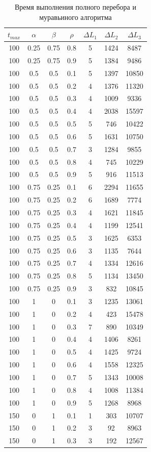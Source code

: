 \documentclass[12pt]{report}
\begin{document}
	\begin{table}[H]
		\begin{center}
			\caption[]{\label{tbl:only3} Время выполнения полного перебора и муравьиного алгоритма}
			\begin{tabular}{|c|c|c|c|c|c|c|}
				\hline
				$t_{max}$ & $\alpha$ & $\beta$& $\rho$ & $\Delta L_{1}$ & $\Delta L_{2}$ & $\Delta L_{3}$\\
				\hline
				100 & 0.25 & 0.75 & 0.8 & 5 & 1424 & 8487 \\
				100 & 0.25 & 0.75 & 0.9 & 5 & 1384 & 9486 \\
				100 & 0.5 & 0.5 & 0.1 & 5 & 1397 & 10850 \\
				100 & 0.5 & 0.5 & 0.2 & 4 & 1376 & 11320 \\
				100 & 0.5 & 0.5 & 0.3 & 4 & 1009 & 9336 \\
				100 & 0.5 & 0.5 & 0.4 & 4 & 2038 & 15597 \\
				100 & 0.5 & 0.5 & 0.5 & 5 & 746 & 10422 \\
				100 & 0.5 & 0.5 & 0.6 & 5 & 1631 & 10750 \\
				100 & 0.5 & 0.5 & 0.7 & 3 & 1284 & 9855 \\
				100 & 0.5 & 0.5 & 0.8 & 4 & 745 & 10229 \\
				100 & 0.5 & 0.5 & 0.9 & 5 & 916 & 11513 \\
				100 & 0.75 & 0.25 & 0.1 & 6 & 2294 & 11655 \\
				100 & 0.75 & 0.25 & 0.2 & 6 & 1689 & 7774 \\
				100 & 0.75 & 0.25 & 0.3 & 4 & 1621 & 11845 \\
				100 & 0.75 & 0.25 & 0.4 & 4 & 1199 & 12541 \\
				100 & 0.75 & 0.25 & 0.5 & 3 & 1625 & 6353 \\
				100 & 0.75 & 0.25 & 0.6 & 3 & 1135 & 7644 \\
				100 & 0.75 & 0.25 & 0.7 & 4 & 1334 & 12616 \\
				100 & 0.75 & 0.25 & 0.8 & 5 & 1134 & 13450 \\
				100 & 0.75 & 0.25 & 0.9 & 3 & 832 & 10845 \\
				100 & 1 & 0 & 0.1 & 3 & 1235 & 13061 \\
				100 & 1 & 0 & 0.2 & 4 & 423 & 15478 \\
				100 & 1 & 0 & 0.3 & 7 & 890 & 10349 \\
				100 & 1 & 0 & 0.4 & 4 & 1406 & 8261 \\
				100 & 1 & 0 & 0.5 & 4 & 1425 & 9724 \\
				100 & 1 & 0 & 0.6 & 4 & 1558 & 12325 \\
				100 & 1 & 0 & 0.7 & 5 & 1343 & 10008 \\
				100 & 1 & 0 & 0.8 & 4 & 1008 & 11384 \\
				100 & 1 & 0 & 0.9 & 5 & 1268 & 8968 \\
				150 & 0 & 1 & 0.1 & 1 & 303 & 10707 \\
				150 & 0 & 1 & 0.2 & 3 & 92 & 8963 \\
				150 & 0 & 1 & 0.3 & 3 & 192 & 12567 \\
				\hline
				

\end{tabular}
\end{center}
\end{table}
\end{document}
